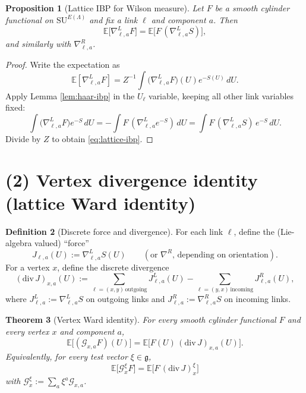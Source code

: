 \documentclass[11pt]{article}
\newtheorem{theorem}{Theorem}[section]
\newtheorem{proposition}[theorem]{Proposition}
\theoremstyle{definition}
\newtheorem{definition}[theorem]{Definition}
\newcommand{\E}{\mathbb{E}}
\newcommand{\SU}{\mathrm{SU}}
\newcommand{\1}{\mathbf{1}}
\newcommand{\g}{\mathfrak{g}}
\begin{document}
\begin{proposition}[Lattice IBP for Wilson measure]\label{prop:lattice-ibp}
Let $F$ be a smooth cylinder functional on $\SU^{E(\Lambda)}$ and fix a link $\ell$ and component $a$.
Then
\begin{equation}\label{eq:lattice-ibp}
  \E\big[\nabla^{L}_{\ell,a} F\big]=\E\big[F\, (\nabla^{L}_{\ell,a} S)\big],
\end{equation}
and similarly with $\nabla^{R}_{\ell,a}$.
\end{proposition}

\begin{proof}
Write the expectation as
\begin{equation*}
 \E[\nabla^{L}_{\ell,a}F]=Z^{-1}\int \big(\nabla^{L}_{\ell,a}F\big)(U)e^{-S(U)}\,dU.
\end{equation*}
Apply Lemma \ref{lem:haar-ibp} in the $U_\ell$ variable, keeping all other link variables fixed:
\begin{equation*}
\int \big(\nabla^{L}_{\ell,a}F\big)e^{-S}\,dU
= -\int F\,(\nabla^{L}_{\ell,a}e^{-S})\,dU
= \int F\, (\nabla^{L}_{\ell,a}S)\,e^{-S}\,dU.
\end{equation*}
Divide by $Z$ to obtain \eqref{eq:lattice-ibp}.
\end{proof}

\section{(2) Vertex divergence identity (lattice Ward identity)}

\begin{definition}[Discrete force and divergence]
For each link $\ell$, define the (Lie-algebra valued) ``force''
\begin{equation}
  J_{\ell,a}(U):=\nabla^{L}_{\ell,a} S(U) \qquad(\text{or }\nabla^R\text{, depending on orientation}).
\end{equation}
For a vertex $x$, define the discrete divergence
\begin{equation}\label{eq:divJ}
  (\mathrm{div}\,J)_{x,a}(U)
  := \sum_{\ell=(x,y)\,\text{outgoing}} J_{\ell,a}^{L}(U)
     - \sum_{\ell=(y,x)\,\text{incoming}} J_{\ell,a}^{R}(U),
\end{equation}
where $J_{\ell,a}^{L}:=\nabla^{L}_{\ell,a}S$ on outgoing links and $J_{\ell,a}^{R}:=\nabla^{R}_{\ell,a}S$ on incoming links.
\end{definition}

\begin{theorem}[Vertex Ward identity]\label{thm:vertex-ward}
For every smooth cylinder functional $F$ and every vertex $x$ and component $a$,
\begin{equation}\label{eq:vertex-ward}
  \E\big[(\mathcal{G}_{x,a}F)(U)\big]=\E\big[F(U)\,(\mathrm{div}\,J)_{x,a}(U)\big].
\end{equation}
Equivalently, for every test vector $\xi\in\g$,
\begin{equation*}
  \E\big[\mathcal{G}_{x}^{\xi}F\big]=\E\big[F\,(\mathrm{div}\,J)_{x}^{\xi}\big]
\end{equation*}
with $\mathcal{G}_x^{\xi}:=\sum_a \xi^a \mathcal{G}_{x,a}$.
\end{theorem}
\end{document}

